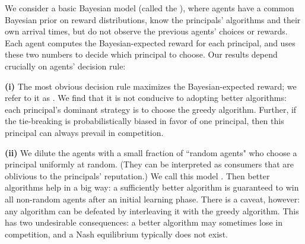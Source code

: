

We consider a basic Bayesian model (called the \emph{\TheoryModel}), where agents have a common Bayesian prior on reward distributions, know the principals' algorithms and their own arrival times, but do not observe the previous agents' choices or rewards. Each agent computes the Bayesian-expected reward for each principal, and uses these two numbers to decide which principal to choose.
Our results depend crucially on agents' decision rule:

\textbf{(i)} The most obvious decision rule maximizes the Bayesian-expected reward; we refer to it as \HardMax. We find that it is not conducive to adopting better algorithms: each principal's dominant strategy is to choose the greedy algorithm. Further,
if the tie-breaking is probabilistically biased in favor of one principal, then this principal can always prevail in competition.

\textbf{(ii)} We dilute the \HardMax agents with a small fraction of ``random agents" who choose a principal uniformly at random.
(They can be interpreted as consumers that are oblivious to the principals' reputation.) We call this model \HardMaxRandom. Then better algorithms help in a big way:  a sufficiently better algorithm is guaranteed to win all non-random agents after an initial learning phase. There is a caveat, however: any algorithm can be defeated by interleaving it with the greedy algorithm. This has two undesirable consequences: a better algorithm may sometimes lose in competition, and a Nash equilibrium typically does not exist.

